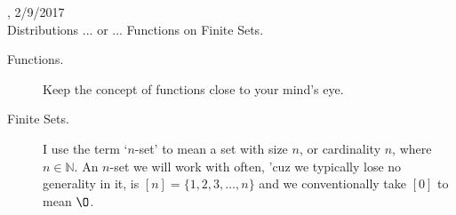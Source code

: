 \documentclass[10pt, AMS Euler]{article}
\newcommand{\N}{\mathbb{N}}
\begin{document}
, 2/9/2017\\

  Distributions ... or ... Functions on Finite Sets.\\




\begin{description}
\item[Functions.]  Keep the concept of functions close to your mind's eye.

\item[Finite Sets.] I use the term `$n$-set' to mean a set with size $n$, or cardinality $n$, where $n \in \N$. 
An $n$-set we will work with often, 'cuz we typically lose no generality in it, is $[n] = \{1,2,3,\dots, n\}$ and 
we conventionally take $[0]$ to mean $\O$.
\end{description}
\end{document}
